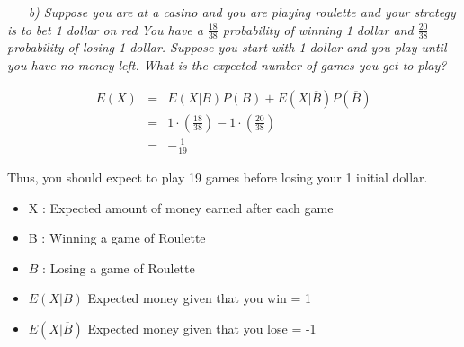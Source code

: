 \documentclass[12pt, letterpaper]{article}
\begin{document}
\-\ \newline
\-\ \it{ b) Suppose you are at a casino and you are playing roulette and your strategy is to bet 1 dollar on
red You have a \(\frac{18}{38}\) probability of winning 1 dollar and \(\frac{20}{38}\) probability of losing 1 dollar.
Suppose you start with 1 dollar and you play until you have no money left. What is the expected
number of games you get to play? }

\begin{eqnarray}
    E(X) &=& E(X | B)P(B) + E(X | \overline{B})P(\overline{B}) \\
    &=& 1 \cdot \left( \frac{18}{38} \right) - 1 \cdot \left( \frac{20}{38} \right) \\
    &=& -\frac{1}{19}
\end{eqnarray}

\textnormal{Thus, you should expect to play 19 games before losing your 1 initial dollar. }

\begin{itemize}
    \item X : Expected amount of money earned after each game
    \item B : Winning a game of Roulette
    \item \(\overline{B}\) : Losing a game of Roulette
    \item \(E(X | B)\) Expected money given that you win = 1
    \item \(E(X | \overline{B})\) Expected money given that you lose = -1
\end{itemize} 
\end{document}
